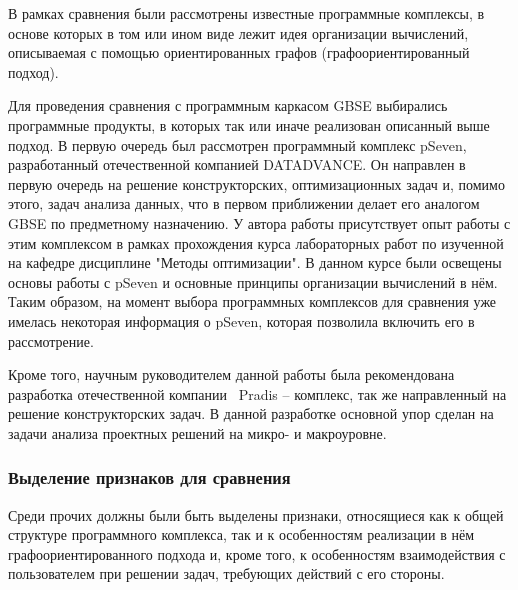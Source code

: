 \def\notedate{2022.02.09}
\def\currentauthor{Тришин И.В. (РК6)}%

В рамках сравнения были рассмотрены известные программные комплексы, в основе которых в том или ином виде лежит идея организации вычислений, описываемая с помощью ориентированных графов (графоориентированный подход).

Для проведения сравнения с программным каркасом GBSE выбирались программные продукты, в которых так или иначе реализован описанный выше подход. В первую очередь был рассмотрен программный комплекс pSeven, разработанный отечественной компанией DATADVANCE. Он направлен в первую очередь на решение конструкторских, оптимизационных задач и, помимо этого, задач анализа данных, что в первом приближении делает его аналогом GBSE по предметному назначению. У автора работы присутствует опыт работы с этим комплексом в рамках прохождения курса лабораторных работ по изученной на кафедре дисциплине "Методы оптимизации". В данном курсе были освещены основы работы с pSeven и основные принципы организации вычислений в нём. Таким образом, на момент выбора программных комплексов для сравнения уже имелась некоторая информация о pSeven, которая позволила включить его в рассмотрение.

Кроме того, научным руководителем данной работы была рекомендована разработка отечественной компании \frqq\ \textsf{Pradis} -- комплекс, так же направленный на решение конструкторских задач. В данной разработке основной упор сделан на задачи анализа проектных решений на микро- и макроуровне.

\subsubsection{Выделение признаков для сравнения}


Среди прочих должны были быть выделены признаки, относящиеся как к общей структуре программного комплекса, так и к особенностям реализации в нём графоориентированного подхода и, кроме того, к особенностям взаимодействия с пользователем при решении задач, требующих действий с его стороны.

